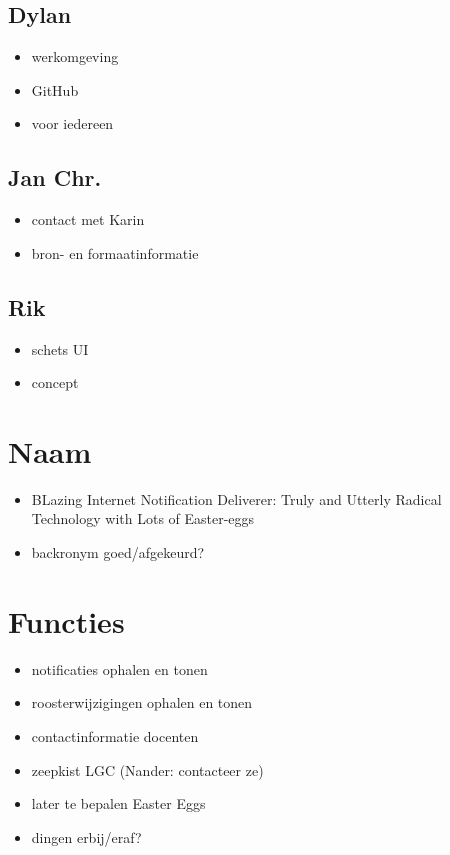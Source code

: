 \documentclass[a4paper, 10pt]{article}
\begin{document}
\subsection{Dylan}
\begin{itemize}
	\item werkomgeving
	\item GitHub
	\item voor iedereen
\end{itemize}

\subsection{Jan Chr.}
\begin{itemize}
	\item contact met Karin
	\item bron- en formaatinformatie
\end{itemize}

\subsection{Rik}
\begin{itemize}
	\item schets UI
	\item concept
\end{itemize}

\newpage
\section{Naam}
\begin{itemize}
	\item BLazing Internet Notification Deliverer: Truly and Utterly Radical
		Technology with Lots of Easter-eggs
	\item backronym goed/afgekeurd?
\end{itemize}

\section{Functies}
\begin{itemize}
	\item notificaties ophalen en tonen
	\item roosterwijzigingen ophalen en tonen
	\item contactinformatie docenten
	\item zeepkist LGC (Nander: contacteer ze)
	\item later te bepalen Easter Eggs
	\item dingen erbij/eraf?
\end{itemize}
\end{document}
